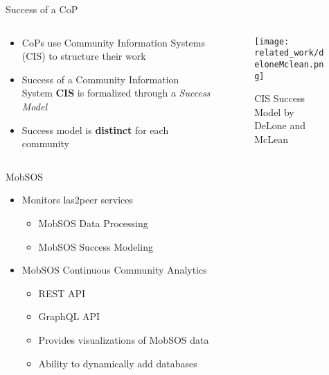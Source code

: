 \begin{frame}{Success of a CoP}
  \begin{columns}
    \begin{column}[]{0.3\textwidth}
      \begin{itemize}
        \item CoPs use Community Information Systems (CIS) to structure their work
              \item Success of a Community Information System \textbf{CIS} is formalized through a \emph{Success Model}
              \item Success model is \textbf{distinct} for each community
      \end{itemize}
    \end{column}
    \begin{column}[]{0.7\textwidth}
      \begin{figure}
        \centering
        \texttt{[image: related\_work/deloneMclean.png]}
        \caption{CIS Success Model by DeLone and McLean \cite{DeMc92}}
      \end{figure}
    \end{column}
  \end{columns}
\end{frame}



\begin{frame}{MobSOS}

  \begin{itemize}
    \item Monitors las2peer services \cite{Renz16}
    \begin{itemize}
        \item MobSOS Data Processing
        \item MobSOS Success Modeling
    \end{itemize}
    \item MobSOS Continuous Community Analytics \cite{Kers20} 
          \begin{itemize}
            \item REST API
            \item GraphQL API
            \item Provides visualizations of MobSOS data
            \item Ability to dynamically add databases
          \end{itemize}
  \end{itemize}
\end{frame}

